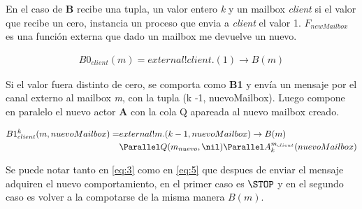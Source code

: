 \documentclass{article}
\begin{document}
En el caso de \textbf{B} recibe una tupla, un valor entero \textit{k} y un mailbox \textit{client} si el valor que recibe un cero, instancia un proceso que envia a \textit{client} el valor 1. $F_{newMailbox}$ es una función externa que dado un mailbox me devuelve un nuevo.

\begin{align}
B0_{client}(m) = external!client.(1) \rightarrow B(m)
  \end{align}

Si el valor fuera distinto de cero, se comporta como \textbf{B1} y envía un mensaje por el canal externo al mailbox \textit{m}, con la tupla (k -1, nuevoMailbox). Luego compone en paralelo el nuevo actor \textbf{A} con la cola Q apareada al nuevo mailbox creado. 

\begin{align}
B1_{client}^{k}(m, nuevoMailbox) = & external!m.(k - 1, nuevoMailbox) \rightarrow B(m) \label{eq:5} \\
&\Parallel Q(m_{nuevo}, \nil) \Parallel A_{k}^{m_{client}}(nuevoMailbox)
\end{align}

Se puede notar tanto en \ref{eq:3} como en \ref{eq:5} que despues de enviar el mensaje adquiren el nuevo comportamiento, en el primer caso es $\STOP$ y en el segundo caso es volver a la compotarse de la misma manera $B(m)$.


{}

\end{document}
